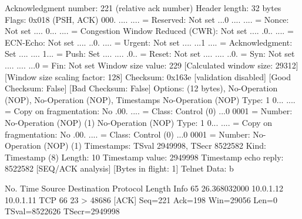     Acknowledgment number: 221    (relative ack number)
    Header length: 32 bytes
    Flags: 0x018 (PSH, ACK)
        000. .... .... = Reserved: Not set
        ...0 .... .... = Nonce: Not set
        .... 0... .... = Congestion Window Reduced (CWR): Not set
        .... .0.. .... = ECN-Echo: Not set
        .... ..0. .... = Urgent: Not set
        .... ...1 .... = Acknowledgment: Set
        .... .... 1... = Push: Set
        .... .... .0.. = Reset: Not set
        .... .... ..0. = Syn: Not set
        .... .... ...0 = Fin: Not set
    Window size value: 229
    [Calculated window size: 29312]
    [Window size scaling factor: 128]
    Checksum: 0x163e [validation disabled]
        [Good Checksum: False]
        [Bad Checksum: False]
    Options: (12 bytes), No-Operation (NOP), No-Operation (NOP), Timestamps
        No-Operation (NOP)
            Type: 1
                0... .... = Copy on fragmentation: No
                .00. .... = Class: Control (0)
                ...0 0001 = Number: No-Operation (NOP) (1)
        No-Operation (NOP)
            Type: 1
                0... .... = Copy on fragmentation: No
                .00. .... = Class: Control (0)
                ...0 0001 = Number: No-Operation (NOP) (1)
        Timestamps: TSval 2949998, TSecr 8522582
            Kind: Timestamp (8)
            Length: 10
            Timestamp value: 2949998
            Timestamp echo reply: 8522582
    [SEQ/ACK analysis]
        [Bytes in flight: 1]
Telnet
    Data: b

No.     Time           Source                Destination           Protocol Length Info
     65 26.368032000   10.0.1.12             10.0.1.11             TCP      66     23 > 48686 [ACK] Seq=221 Ack=198 Win=29056 Len=0 TSval=8522626 TSecr=2949998

